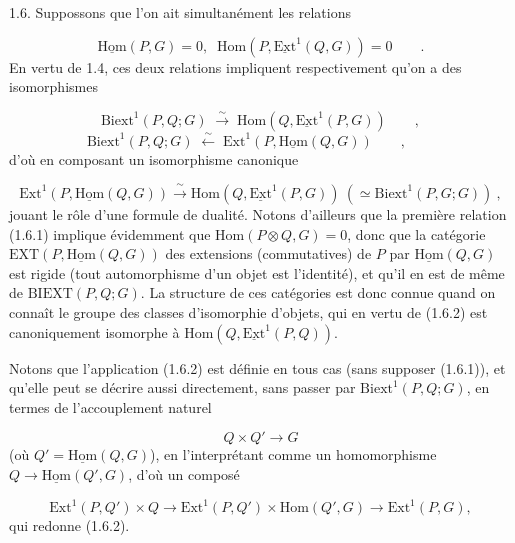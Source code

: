 1.6.  Suppossons que l'on ait simultanément les relations

\begin{equation}\tag{1.6.1}
\underline{\mathrm{Hom}}(P,G) = 0, \;\; \mathrm{Hom}(P,\underline{\mathrm{Ext}}^1(Q,G)) = 0 \qquad .
\end{equation}
En vertu de 1.4, ces deux relations impliquent respectivement qu'on a des isomorphismes

\begin{equation*}
\mathrm{Biext}^1(P,Q;G) \;\stackrel{\sim}{\longrightarrow}\; \mathrm{Hom}(Q,\underline{\mathrm{Ext}}^1(P,G)) \qquad ,
\end{equation*}
\begin{equation*}
\mathrm{Biext}^1(P,Q;G) \;\stackrel{\sim}{\longleftarrow}\; \mathrm{Ext}^1(P,\underline{\mathrm{Hom}}(Q,G)) \qquad , \qquad 
\end{equation*}
 d'où en composant un isomorphisme canonique

\begin{equation}\tag{1.6.2}
\mathrm{Ext}^1(P,\underline{\mathrm{Hom}}(Q,G)) \xrightarrow{\ \sim\ } \mathrm{Hom}(Q,\underline{\mathrm{Ext}}^1(P,G)) \ ( \simeq \mathrm{Biext}^1(P,G;G)) \ ,
\end{equation}
jouant le rôle d'une formule de dualité. Notons d'ailleurs que la première relation (1.6.1) implique évidemment que $\mathrm{Hom}(P \otimes Q,G) = 0$, donc que la catégorie $\mathrm{EXT}(P,\underline{\mathrm{Hom}}(Q,G))$ des extensions (commutatives) de $P$ par $\underline{\mathrm{Hom}}(Q,G)$ est rigide (tout automorphisme d'un objet est l'identité), et qu'il en est de même de $\mathrm{BIEXT}(P,Q;G)$. La structure de ces catégories est donc connue quand on connaît le groupe des classes d'isomorphie d'objets, qui en vertu de (1.6.2) est canoniquement isomorphe à $\mathrm{Hom}(Q,\underline{\mathrm{Ext}}^1(P,Q))$.

Notons que l'application (1.6.2) est définie en tous cas (sans supposer (1.6.1)), et qu'elle peut se décrire aussi directement, sans passer par $\mathrm{Biext}^1(P,Q;G)$, en termes de l'accouplement naturel

\begin{equation*}
Q \times Q' \longrightarrow G
\end{equation*}
(où $Q' = \underline{\mathrm{Hom}}(Q,G)$), en l'interprétant comme un homomorphisme $Q \to \underline{\mathrm{Hom}}(Q',G)$, d'où un composé

\begin{equation}\tag{1.6.3}
\mathrm{Ext}^1(P,Q') \times Q \to \mathrm{Ext}^1(P,Q') \times \mathrm{Hom}(Q',G) \longrightarrow \mathrm{Ext}^1(P,G),
\end{equation}
qui redonne (1.6.2).

